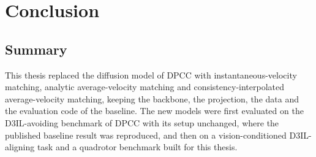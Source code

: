 
\chapter{Conclusion}\label{ch:conclusion}

\section{Summary}\label{sec:conc:summary}

This thesis replaced the diffusion model of \ac{DPCC} with instantaneous-velocity matching, analytic
average-velocity matching and consistency-interpolated average-velocity matching, keeping the backbone,
the projection, the data and the evaluation code of the baseline. The
new models were first evaluated on the D3IL-avoiding benchmark of \ac{DPCC} with its setup
unchanged, where the published baseline result was reproduced, and then on a vision-conditioned
D3IL-aligning task and a quadrotor benchmark built for this thesis.

